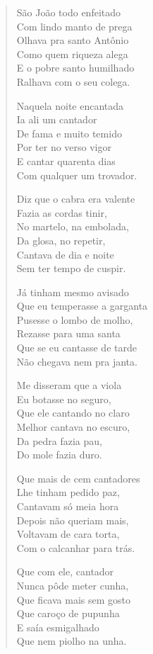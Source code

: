 \begin{verse}
São João todo enfeitado\\
Com lindo manto de prega\\
Olhava pra santo Antônio\\
Como quem riqueza alega\\
E o pobre santo humilhado\\
Ralhava com o seu colega.
\pagebreak

Naquela noite encantada\\
Ia ali um cantador\\
De fama e muito temido\\
Por ter no verso vigor\\
E cantar quarenta dias\\
Com qualquer um trovador.

Diz que o cabra era valente\\
Fazia as cordas tinir,\\
No martelo, na embolada,\\
Da glosa, no repetir,\\
Cantava de dia e noite\\
Sem ter tempo de cuspir.

Já tinham mesmo avisado\\
Que eu temperasse a garganta\\
Pusesse o lombo de molho,\\
Rezasse para uma santa\\
Que se eu cantasse de tarde\\
Não chegava nem pra janta.

Me disseram que a viola\\
Eu botasse no seguro,\\
Que ele cantando no claro\\
Melhor cantava no escuro,\\
Da pedra fazia pau,\\
Do mole fazia duro.
\pagebreak

Que mais de cem cantadores\\
Lhe tinham pedido paz,\\
Cantavam só meia hora\\
Depois não queriam mais,\\
Voltavam de cara torta,\\
Com o calcanhar para trás.

Que com ele, cantador\\
Nunca pôde meter cunha,\\
Que ficava mais sem gosto\\
Que caroço de pupunha\\
E saía esmigalhado\\
Que nem piolho na unha.


\end{verse}
